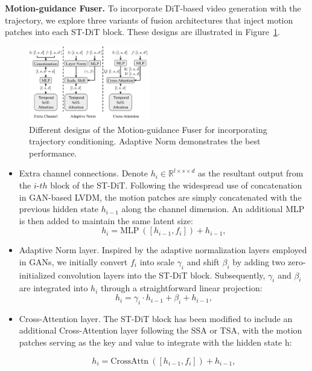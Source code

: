 \noindent \textbf{Motion-guidance Fuser.} To incorporate DiT-based video generation with the trajectory, we explore three variants of fusion architectures that inject motion patches into each ST-DiT block. These designs are illustrated in Figure~\ref{fig:4}.

\begin{figure}[!t]
    \centering
    \includegraphics[width=0.47\textwidth]{images/fuser.pdf}
    \caption{
        Different designs of the Motion-guidance Fuser for incorporating trajectory conditioning. Adaptive Norm demonstrates the best performance.
    }
    \label{fig:4}   
\end{figure}

\begin{itemize}[label=-]
\item Extra channel connections. Denote $h_i \in \mathbb{R}^{l \times s \times d} $ as the resultant output from the $i$-$th$ block of the ST-DiT. Following the widespread use of concatenation in GAN-based LVDM, the motion patches are simply concatenated with the previous hidden state $h_{i-1}$ along the channel dimension. An additional MLP is then added to maintain the same latent size:
\begin{equation}
h_{i} = \mathrm{MLP}~([h_{i-1}, f_i]) + h_{i-1},
\end{equation}
\item Adaptive Norm layer. Inspired by the adaptive normalization layers employed in GANs, we initially convert $f_i$ into scale $\gamma_{i}$ and shift $\beta_{i}$ by adding two zero-initialized convolution layers into the ST-DiT block. Subsequently, $\gamma_{i}$ and $\beta_{i}$ are integrated into $h_i$ through a straightforward linear projection:
\begin{equation}
h_{i} = \gamma_{i} \cdot h_{i-1} + \beta_{i} + h_{i-1},
\end{equation}

\item Cross-Attention layer. The ST-DiT block has been modified to include an additional Cross-Attention layer following the SSA or TSA, with the motion patches serving as the key and value to integrate with the hidden state h: 

\begin{equation}
h_{i} = \mathrm{CrossAttn}~([h_{i-1}, f_i]) + h_{i-1},
\end{equation}
\end{itemize}

